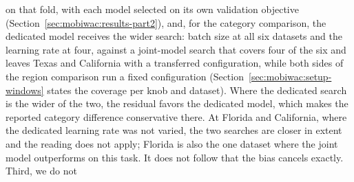 on that fold, with each model selected on its own validation objective (Section~\ref{sec:mobiwac:results-part2}),
and, for the category comparison, the dedicated model receives the wider search: batch size at all
six datasets and the learning rate at four, against a joint-model search that covers four of the six
and leaves Texas and California with a transferred configuration, while both sides of the region
comparison run a fixed configuration (Section~\ref{sec:mobiwac:setup-windows} states the coverage
per knob and dataset). Where the dedicated search is the wider of the two, the residual favors the
dedicated model, which makes the reported category difference conservative there. At Florida and
California, where the dedicated learning rate was not varied, the two searches are closer in extent
and the reading does not apply; Florida is also the one dataset where the joint model outperforms on
this task. It does not follow that the bias cancels exactly. Third, we do not
